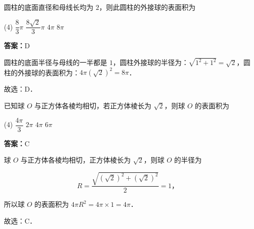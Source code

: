 \vspace{2em}


\begin{example}[\bkstar{3}{5}]
圆柱的底面直径和母线长均为 $2$，则此圆柱的外接球的表面积为
\begin{tasks}(4)
    \task $\dfrac{8}{3}\pi$
    \task $\dfrac{8\sqrt{2}}{3}\pi$
    \task $4\pi$
    \task $8\pi$
\end{tasks}
\end{example}
\begin{solution}
\textbf{答案：}D

圆柱的底面半径与母线的一半都是 $1$，圆柱外接球的半径为：$\sqrt{1^2+1^2}=\sqrt{2}$，圆柱的外接球的表面积为：$4\pi\left(\sqrt{2}\right)^2=8\pi$．

故选：D．
\end{solution}

\vspace{2em}

\begin{example}[\bkstar{3}{5}]
已知球 $O$ 与正方体各棱均相切，若正方体棱长为 $\sqrt{2}$，则球 $O$ 的表面积为
\begin{tasks}(4)
    \task $\dfrac{4\pi}{3}$
    \task $2\pi$
    \task $4\pi$
    \task $6\pi$
\end{tasks}
\end{example}
\begin{solution}
\textbf{答案：}C

球 $O$ 与正方体各棱均相切，正方体棱长为 $\sqrt{2}$，则球 $O$ 的半径为

$$
R=\dfrac{\sqrt{\left(\sqrt{2}\right)^2+\left(\sqrt{2}\right)^2}}{2}=1，
$$

所以球 $O$ 的表面积为 $4\pi R^2=4\pi\times 1=4\pi$．

故选：C．
\end{solution}

\vspace{2em}


